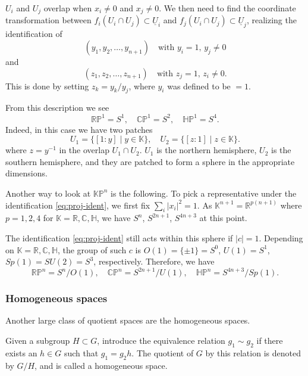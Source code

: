 \documentclass[12pt]{article}
\numberwithin{equation}{section}
\def\bC{\mathbb{C}}
\def\bH{\mathbb{H}}
\def\bK{\mathbb{K}}
\def\bR{\mathbb{R}}
\def\RP{\mathbb{RP}}
\def\CP{\mathbb{CP}}
\def\HP{\mathbb{HP}}
\def\KP{\mathbb{KP}}
\begin{document}
$U_i$ and $U_j$ overlap when $x_i\neq 0$ and $x_j\neq 0$.
We then need to find the coordinate transformation 
between $f_i(U_i \cap U_j )\subset \underline{U}_i$
and $f_j(U_i \cap U_j) \subset \underline{U}_j$, realizing the identification of
\begin{equation}
  (y_1,y_2,\ldots,y_{n+1}) \quad \text{with $y_i=1$, $y_j\neq 0$}
\end{equation} and 
\begin{equation}
  (z_1,z_2,\ldots,z_{n+1}) \quad \text{with $z_j=1$, $z_i\neq 0$}.
\end{equation}
This is done by setting $z_k = y_k / y_j$, where $y_i$ was defined to be $=1$.

From this description we see \begin{equation}
\RP^1=S^1,\quad
\CP^1=S^2,\quad
\HP^1=S^4.
\label{eq:KP1}
\end{equation}
Indeed, in this case we have two patches \begin{equation}
  U_1 = \{ [1:y] \mid y\in \bK \}, \quad U_2 = \{ [z:1] \mid z\in \bK \}.
\end{equation} where $z=y^{-1}$ in the overlap $U_1\cap U_2$.
$U_1$ is the northern hemisphere,
$U_2$ is the southern hemisphere,
and they are patched to form a sphere in the appropriate dimensions.

Another way to look at $\KP^n$ is the following. 
To pick a representative under the identification \eqref{eq:proj-ident},
we first fix $\sum_i |x_i|^2 =1$.
As $\bK^{n+1}=\bR^{p(n+1)}$ where $p=1,2,4$ for $\bK=\bR,\bC,\bH$,
we have $S^n$, $S^{2n+1}$, $S^{4n+3}$ at this point.

The identification \eqref{eq:proj-ident} still acts within this sphere
if $|c|=1$. 
Depending on $\bK=\bR,\bC,\bH$, the group of such $c$ is $O(1)=\{\pm1\}=S^0$, $U(1)=S^1$, $Sp(1)=SU(2)=S^3$, respectively.
Therefore, we have \begin{equation}
\RP^n=S^n/O(1), \quad \CP^n=S^{2n+1}/U(1), \quad \HP^n=S^{4n+3}/Sp(1).
\label{eq:sphere-proj}
\end{equation}

\subsubsection{Homogeneous spaces}
\label{sec:homogeneous}
Another large class of quotient spaces
are the homogeneous spaces.
\begin{definition}
  \label{def:homogeneous-space}
  Given a subgroup $H\subset G$,
  introduce the equivalence relation $g_1\sim g_2$ if 
  there exists an $h\in G$ such that $g_1=g_2 h$.
  The quotient of $G$ by this relation is denoted by $G/H$,
  and is called a homogeneous space.
\end{definition}
\end{document}
